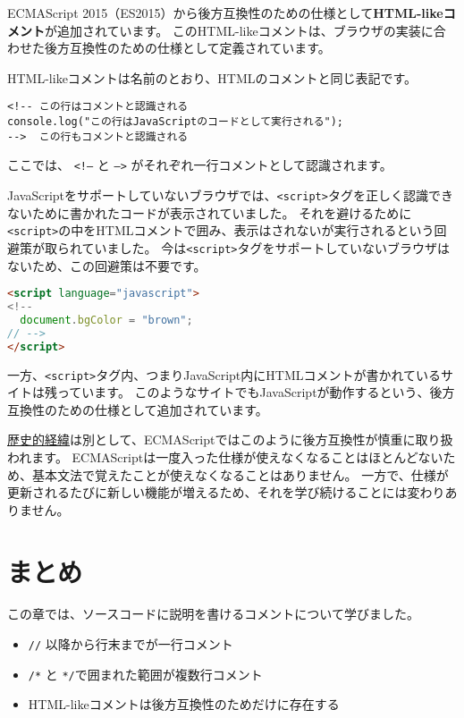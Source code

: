 ECMAScript
2015（ES2015）から後方互換性のための仕様として\textbf{HTML-likeコメント}が追加されています。
このHTML-likeコメントは、ブラウザの実装に合わせた後方互換性のための仕様として定義されています。

HTML-likeコメントは名前のとおり、HTMLのコメントと同じ表記です。

\begin{lstlisting}
<!-- この行はコメントと認識される
console.log("この行はJavaScriptのコードとして実行される");
-->  この行もコメントと認識される
\end{lstlisting}

ここでは、 \texttt{<!--} と
\texttt{-->} がそれぞれ一行コメントとして認識されます。

JavaScriptをサポートしていないブラウザでは、\texttt{<script>}タグを正しく認識できないために書かれたコードが表示されていました。
それを避けるために\texttt{<script>}の中をHTMLコメントで囲み、表示はされないが実行されるという回避策が取られていました。
今は\texttt{<script>}タグをサポートしていないブラウザはないため、この回避策は不要です。

\begin{lstlisting}[language=HTML]
<script language="javascript">
<!--
  document.bgColor = "brown";
// -->
</script>
\end{lstlisting}

一方、\texttt{<script>}タグ内、つまりJavaScript内にHTMLコメントが書かれているサイトは残っています。
このようなサイトでもJavaScriptが動作するという、後方互換性のための仕様として追加されています。

\href{https://dev.mozilla.jp/2016/03/es6-in-depth-arrow-functions/}{歴史的経緯}は別として、ECMAScriptではこのように後方互換性が慎重に取り扱われます。
ECMAScriptは一度入った仕様が使えなくなることはほとんどないため、基本文法で覚えたことが使えなくなることはありません。
一方で、仕様が更新されるたびに新しい機能が増えるため、それを学び続けることには変わりありません。

\hypertarget{conclusion}{%
\section{まとめ}\label{conclusion}}

この章では、ソースコードに説明を書けるコメントについて学びました。

\begin{itemize}
\item
  \texttt{//} 以降から行末までが一行コメント
\item
  \texttt{/*} と
  \texttt{*/}で囲まれた範囲が複数行コメント
\item
  HTML-likeコメントは後方互換性のためだけに存在する
\end{itemize}
